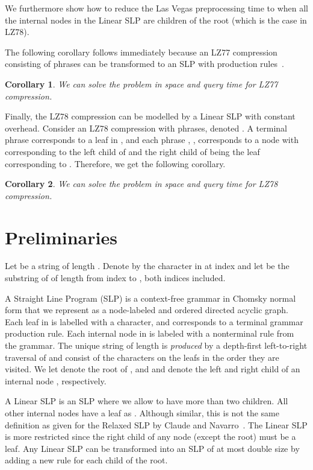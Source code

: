 \documentclass[11pt]{article}
\newtheorem{corollary}{Corollary}
\begin{document}
	


\noindent We furthermore show how to reduce the Las Vegas preprocessing time to  when all the internal nodes in the Linear SLP are children of the root (which is the case in LZ78).

The following corollary follows immediately because an LZ77 compression~\cite{lz77} consisting of  phrases can be transformed to an SLP with  production rules~\cite{charikar2005smallest,rytter2003application}.

\begin{corollary}
	We can solve the  problem in  space and query time  for LZ77 compression.
\end{corollary}

\noindent Finally, the LZ78 compression can be modelled by a Linear SLP  with constant overhead. Consider an LZ78 compression with  phrases, denoted . A terminal phrase corresponds to a leaf in , and each phrase , , corresponds to a node  with  corresponding to the left child of  and the right child of  being the leaf corresponding to . Therefore, we get the following corollary.

\begin{corollary}
	We can solve the  problem in  space and query time  for LZ78 compression.
\end{corollary}

\section{Preliminaries}
Let  be a string of length . Denote by  the character in  at index  and let  be the substring of  of length  from index  to , both indices included.

A Straight Line Program (SLP)  is a context-free grammar in Chomsky normal form that we represent as a node-labeled and ordered directed acyclic graph. Each leaf in  is labelled with a character, and corresponds to a terminal grammar production rule. Each internal node in  is labeled with a nonterminal rule from the grammar. The unique string  of length  is \emph{produced} by a depth-first left-to-right traversal of  and consist of the characters on the leafs in the order they are visited. We let  denote the root of , and  and  denote the left and right child of an internal node , respectively.

A Linear SLP  is an SLP where we allow  to have more than two children. All other internal nodes  have a leaf as . Although similar, this is not the same definition as given for the Relaxed SLP by Claude and Navarro~\cite{claude2011self}. The Linear SLP is more restricted since the right child of any node (except the root) must be a leaf. Any Linear SLP can be transformed into an SLP of at most double size by adding a new rule for each child of the root.
\end{document}
